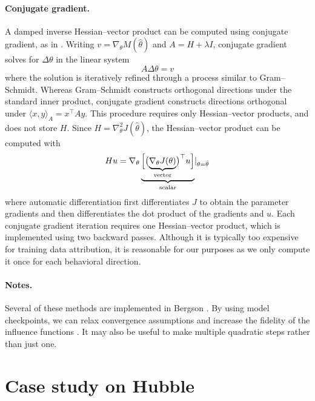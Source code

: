 \documentclass{article}
\begin{document}
\paragraph{Conjugate gradient.}
A damped inverse Hessian--vector product can be computed using conjugate gradient, as in \cite{koh_understanding_2017}. Writing \(v=\nabla_\theta M(\hat{\theta})\) and \(A=H+\lambda I\), conjugate gradient solves for \(\Delta\theta\) in the linear system
\begin{equation}
    A\Delta\theta=v
\end{equation}
where the solution is iteratively refined through a process similar to Gram--Schmidt. Whereas Gram--Schmidt constructs orthogonal directions under the standard inner product, conjugate gradient constructs directions orthogonal under 
\(\langle x,y\rangle_A=x^\top Ay\). This procedure requires only Hessian--vector products, and does not store \(H\). Since \(H=\nabla_\theta^2J(\hat{\theta})\), the Hessian--vector product can be computed with
\begin{equation}
    Hu
    =
    \nabla_\theta
    \underbrace{
        \Bigl[
            \bigl(
                \underbrace{
                    \nabla_\theta J(\theta)
                }_{\text{vector}}
            \bigr)^\top u
        \Bigr]
    }_{\text{scalar}}
    \rvert_{\theta=\hat{\theta}}
\end{equation}
where automatic differentiation first differentiates \(J\) to obtain the parameter gradients and then differentiates the dot product of the gradients and \(u\). Each conjugate gradient iteration requires one Hessian--vector product, which is implemented using two backward passes. Although it is typically too expensive for training data attribution, it is reasonable for our purposes as we only compute it once for each behavioral direction.

\paragraph{Notes.} Several of these methods are implemented in Bergson \cite{quirke2026bergsonopensourcelibrary}. By using model checkpoints, we can relax convergence assumptions and increase the fidelity of the influence functions \cite{bae2024training}. It may also be useful to make multiple quadratic steps rather than just one.

\section{Case study on Hubble}
\end{document}
